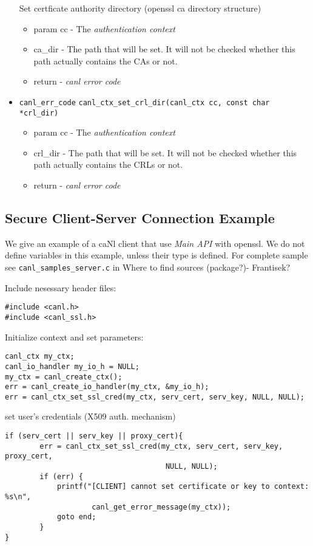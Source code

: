 \begin{itemize}
  Set certficate authority directory (openssl ca directory structure)
    \begin{itemize} 
    \item param cc - The \textit{authentication context}
    \item ca\_dir - The path that will be set.  It will not be 
    checked whether this path actually contains the CAs or not.
    \item return - \textit{canl error code}
    \end{itemize}
  \item \verb'canl_err_code'
  \verb'canl_ctx_set_crl_dir(canl_ctx cc, const char *crl_dir)'
    \begin{itemize} 
    \item param cc - The \textit{authentication context}
    \item crl\_dir - The path that will be set.  It will not be 
    checked whether this path actually contains the CRLs or not.
    \item return - \textit{canl error code}
    \end{itemize}

\end{itemize}
\subsection{Secure Client-Server Connection Example}
We give an example of a caNl client that use \textit{Main API} 
with openssl. We do not define variables in this example, unless
their type is \CANL defined. For complete sample see 
{\tt canl\_samples\_server.c} in 
\TODO Where to find sources (package?)- Frantisek?

Include nesessary header files:
\begin{lstlisting}
#include <canl.h>
#include <canl_ssl.h>
\end{lstlisting}

Initialize context and set parameters:
\begin{lstlisting}
canl_ctx my_ctx;
canl_io_handler my_io_h = NULL;
my_ctx = canl_create_ctx();
err = canl_create_io_handler(my_ctx, &my_io_h);
err = canl_ctx_set_ssl_cred(my_ctx, serv_cert, serv_key, NULL, NULL);
\end{lstlisting}

set user's credentials (X509 auth. mechanism)
\begin{lstlisting}
if (serv_cert || serv_key || proxy_cert){
        err = canl_ctx_set_ssl_cred(my_ctx, serv_cert, serv_key, proxy_cert,
                                     NULL, NULL);
        if (err) {
            printf("[CLIENT] cannot set certificate or key to context: %s\n",
                    canl_get_error_message(my_ctx));
            goto end;
        }
}
\end{lstlisting}

